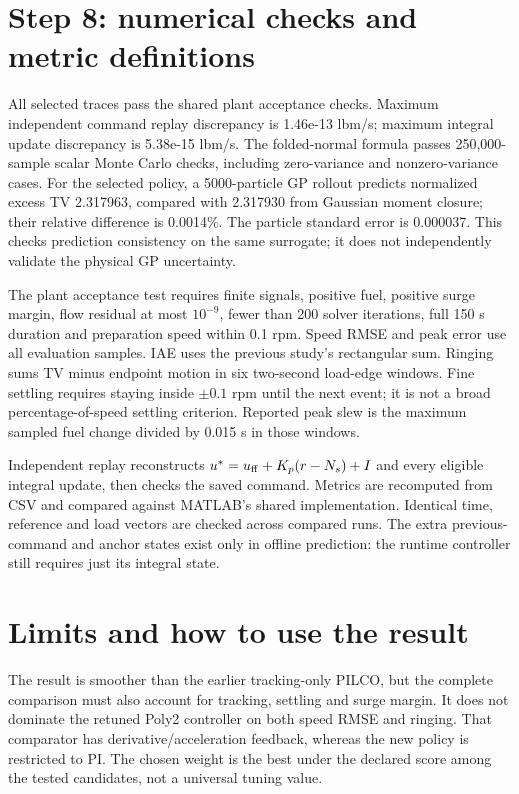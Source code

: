 \section{Step 8: numerical checks and metric definitions}
All selected traces pass the shared plant acceptance checks. Maximum independent command replay discrepancy is 1.46e-13 lbm/s; maximum integral update discrepancy is 5.38e-15 lbm/s. The folded-normal formula passes 250,000-sample scalar Monte Carlo checks, including zero-variance and nonzero-variance cases. For the selected policy, a 5000-particle GP rollout predicts normalized excess TV 2.317963, compared with 2.317930 from Gaussian moment closure; their relative difference is 0.0014\%. The particle standard error is 0.000037. This checks prediction consistency on the same surrogate; it does not independently validate the physical GP uncertainty.

The plant acceptance test requires finite signals, positive fuel, positive surge margin, flow residual at most $10^{-9}$, fewer than 200 solver iterations, full 150 s duration and preparation speed within 0.1 rpm. Speed RMSE and peak error use all evaluation samples. IAE uses the previous study's rectangular sum. Ringing sums TV minus endpoint motion in six two-second load-edge windows. Fine settling requires staying inside $\pm0.1$ rpm until the next event; it is not a broad percentage-of-speed settling criterion. Reported peak slew is the maximum sampled fuel change divided by 0.015 s in those windows.

Independent replay reconstructs $u^*=u_{\rm ff}+K_p(r-N_s)+I$ and every eligible integral update, then checks the saved command. Metrics are recomputed from CSV and compared against MATLAB's shared implementation. Identical time, reference and load vectors are checked across compared runs. The extra previous-command and anchor states exist only in offline prediction: the runtime controller still requires just its integral state.

\section{Limits and how to use the result}
The result is smoother than the earlier tracking-only PILCO, but the complete comparison must also account for tracking, settling and surge margin. It does not dominate the retuned Poly2 controller on both speed RMSE and ringing. That comparator has derivative/acceleration feedback, whereas the new policy is restricted to PI. The chosen weight is the best under the declared score among the tested candidates, not a universal tuning value.

